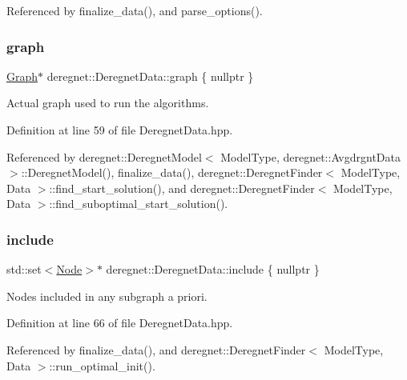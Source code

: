 Referenced by finalize\+\_\+data(), and parse\+\_\+options().

\mbox{\label{classderegnet_1_1DeregnetData_ab76d30fa2ef87099faecb31e3f95b6d6}} 
\subsubsection{\texorpdfstring{graph}{graph}}
{\footnotesize\ttfamily \hyperlink{namespacederegnet_a55b76c55bbabc682cbc61f8b9948799e}{Graph}$\ast$ deregnet\+::\+Deregnet\+Data\+::graph \{ nullptr \}}



Actual graph used to run the algorithms. 



Definition at line 59 of file Deregnet\+Data.\+hpp.



Referenced by deregnet\+::\+Deregnet\+Model$<$ Model\+Type, deregnet\+::\+Avgdrgnt\+Data $>$\+::\+Deregnet\+Model(), finalize\+\_\+data(), deregnet\+::\+Deregnet\+Finder$<$ Model\+Type, Data $>$\+::find\+\_\+start\+\_\+solution(), and deregnet\+::\+Deregnet\+Finder$<$ Model\+Type, Data $>$\+::find\+\_\+suboptimal\+\_\+start\+\_\+solution().

\mbox{\label{classderegnet_1_1DeregnetData_a438d16e60be5d119d174aa039f070ab2}} 
\subsubsection{\texorpdfstring{include}{include}}
{\footnotesize\ttfamily std\+::set$<$\hyperlink{namespacederegnet_a744bad34f2de9856d36715a445f027f3}{Node}$>$$\ast$ deregnet\+::\+Deregnet\+Data\+::include \{ nullptr \}}



Nodes included in any subgraph a priori. 



Definition at line 66 of file Deregnet\+Data.\+hpp.



Referenced by finalize\+\_\+data(), and deregnet\+::\+Deregnet\+Finder$<$ Model\+Type, Data $>$\+::run\+\_\+optimal\+\_\+init().

